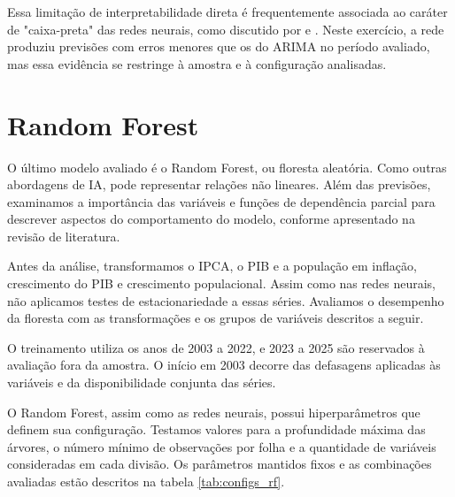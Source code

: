 Essa limitação de interpretabilidade direta é frequentemente associada ao caráter de "caixa-preta" das redes neurais, como discutido por  e . Neste exercício, a rede produziu previsões com erros menores que os do ARIMA no período avaliado, mas essa evidência se restringe à amostra e à configuração analisadas.

\section{Random Forest}

O último modelo avaliado é o Random Forest, ou floresta aleatória. Como outras abordagens de IA, pode representar relações não lineares. Além das previsões, examinamos a importância das variáveis e funções de dependência parcial para descrever aspectos do comportamento do modelo, conforme apresentado na revisão de literatura.

Antes da análise, transformamos o IPCA, o PIB e a população em inflação, crescimento do PIB e crescimento populacional. Assim como nas redes neurais, não aplicamos testes de estacionariedade a essas séries. Avaliamos o desempenho da floresta com as transformações e os grupos de variáveis descritos a seguir.

O treinamento utiliza os anos de 2003 a 2022, e 2023 a 2025 são reservados à avaliação fora da amostra. O início em 2003 decorre das defasagens aplicadas às variáveis e da disponibilidade conjunta das séries.

O Random Forest, assim como as redes neurais, possui hiperparâmetros que definem sua configuração. Testamos valores para a profundidade máxima das árvores, o número mínimo de observações por folha e a quantidade de variáveis consideradas em cada divisão. Os parâmetros mantidos fixos e as combinações avaliadas estão descritos na tabela \ref{tab:configs_rf}.




